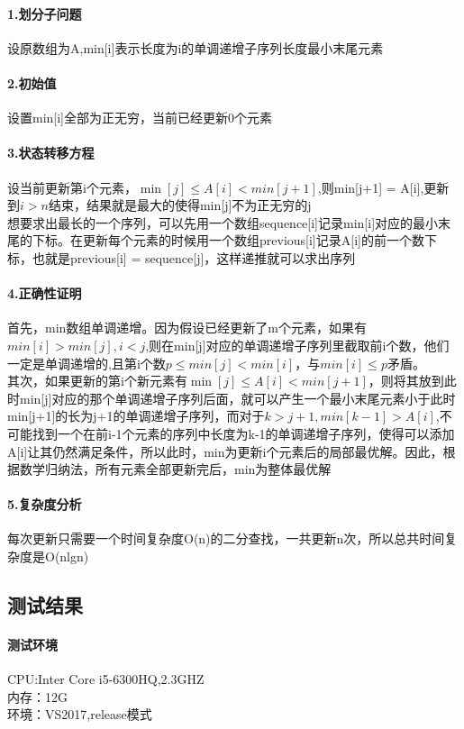\documentclass{article}
\begin{document}
\begin{CJK}{UTF8}{gkai}
\paragraph{1.划分子问题}设原数组为A,min[i]表示长度为i的单调递增子序列长度最小末尾元素
\paragraph{2.初始值}设置min[i]全部为正无穷，当前已经更新0个元素\\
\paragraph{3.状态转移方程}
设当前更新第i个元素，$\min[j]\leq A[i] < min[j+1]$,则min[j+1]
 = A[i],更新到$i>n$结束，结果就是最大的使得min[j]不为正无穷的j\\
  想要求出最长的一个序列，可以先用一个数组sequence[i]记录min[i]对应的最小末尾的下标。在更新每个元素的时候用一个数组previous[i]记录A[i]的前一个数下标，也就是previous[i] = sequence[j]，这样递推就可以求出序列\\
\paragraph{4.正确性证明}首先，min数组单调递增。因为假设已经更新了m个元素，如果有$min[i]>min[j],i<j$,则在min[j]对应的单调递增子序列里截取前i个数，他们一定是单调递增的,且第i个数$p \leq min[j] < min[i]$，与$min[i] \leq p $矛盾。\\
 其次，如果更新的第i个新元素有$\min[j]\leq A[i] < min[j+1]$，则将其放到此时min[j]对应的那个单调递增子序列后面，就可以产生一个最小末尾元素小于此时min[j+1]的长为j+1的单调递增子序列，而对于$k > j+1,min[k-1]>A[i]$,不可能找到一个在前i-1个元素的序列中长度为k-1的单调递增子序列，使得可以添加A[i]让其仍然满足条件，所以此时，min为更新i个元素后的局部最优解。因此，根据数学归纳法，所有元素全部更新完后，min为整体最优解\\
\paragraph{5.复杂度分析}每次更新只需要一个时间复杂度O(n)的二分查找，一共更新n次，所以总共时间复杂度是O(nlgn)\\
\subsection{测试结果}
\paragraph{测试环境}
CPU:Inter Core i5-6300HQ,2.3GHZ\\
内存：12G\\
环境：VS2017,release模式

\end{CJK}
\end{document}
